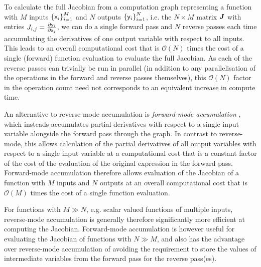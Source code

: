 To calculate the full Jacobian from a computation graph representing a function with $M$ inputs $\fset{\rvar{x}_i}_{i=1}^M$ and $N$ outputs $\fset{\rvar{y}_i}_{i=1}^N$, i.e. the $N \times M$ matrix $\boldsymbol{J}$ with entries $J_{i,j} = \frac{\partial \mathsf{y}_i}{\partial \mathsf{x}_j}$, we can do a single forward pass and $N$ reverse passes each time accumulating the derivatives of one output variable with respect to all inputs. This leads to an overall computational cost that is $\mathcal{O}(N)$ times the cost of a single (forward) function evaluation to evaluate the full Jacobian. As each of the reverse passes can trivially be run in parallel (in addition to any parallelisation of the operations in the forward and reverse passes themselves), this $\mathcal{O}(N)$ factor in the operation count need not corresponds to an equivalent increase in compute time.

An alternative to reverse-mode accumulation is \emph{forward-mode accumulation} \citep{wengert1964simple}, which insteads accumulates partial derivatives with respect to a single input variable alongside the forward pass through the graph. In contrast to reverse-mode, this allows calculation of the partial derivatives of all output variables with respect to a single input variable at a computational cost that is a constant factor of the cost of the evaluation of the original expression in the forward pass. Forward-mode accumulation therefore allows evaluation of the Jacobian of a function with $M$ inputs and $N$ outputs at an overall computational cost that is $\mathcal{O}(M)$ times the cost of a single function evaluation. 

For functions with $M \gg N$, e.g. scalar valued functions of multiple inputs, reverse-mode accumulation is generally therefore significantly more efficient at computing the Jacobian. Forward-mode accumulation is however useful for evaluating the Jacobian of functions with $N \gg M$, and also has the advantage over reverse-mode accumulation of avoiding the requirement to store the values of intermediate variables from the forward pass for the reverse pass(es).


